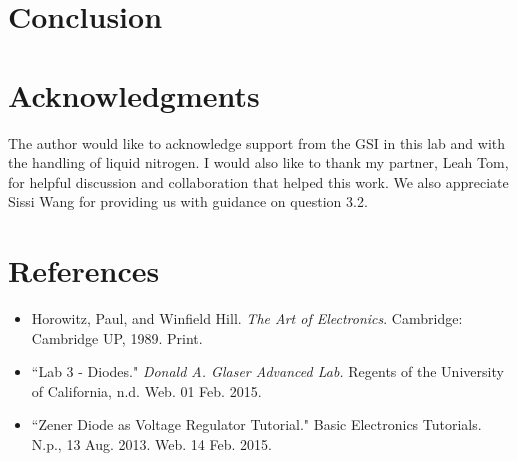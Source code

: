 \documentclass[authoryear, 12pt,5p, times]{elsarticle}
\begin{document}
\section{Conclusion}
\section*{Acknowledgments}
\begin{footnotesize}
The author would like to acknowledge support from the GSI in this lab and with the handling of liquid nitrogen. I would also like to thank my partner, Leah Tom, for helpful discussion and collaboration that helped this work. We also appreciate Sissi Wang for providing us with guidance on question 3.2.
\end{footnotesize}
  \section*{References}
 \begin{footnotesize}
 \begin{itemize}
 \item Horowitz, Paul, and Winfield Hill. \textit{The Art of Electronics}. Cambridge: Cambridge UP, 1989. Print.
 
 \item ``Lab 3 - Diodes." \textit{Donald A. Glaser Advanced Lab.} Regents of the University of California, n.d. Web. 01 Feb. 2015.
  \item ``Zener Diode as Voltage Regulator Tutorial." Basic Electronics Tutorials. N.p., 13 Aug. 2013. Web. 14 Feb. 2015.
\end{itemize} 
  \end{footnotesize}
\end{document}

